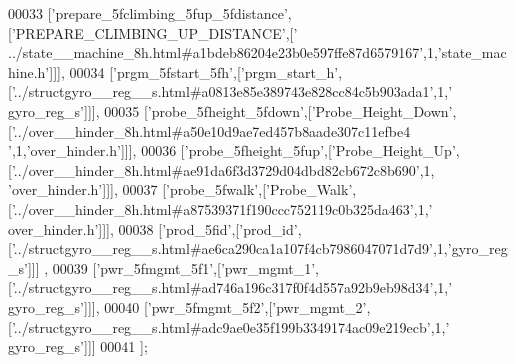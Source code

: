 \begin{DoxyCode}
00033   [\textcolor{stringliteral}{'prepare\_5fclimbing\_5fup\_5fdistance'},[\textcolor{stringliteral}{'PREPARE\_CLIMBING\_UP\_DISTANCE'},[\textcolor{stringliteral}{'
      ../state\_\_machine\_8h.html#a1bdeb86204e23b0e597ffe87d6579167'},1,\textcolor{stringliteral}{'state\_machine.h'}]]],
00034   [\textcolor{stringliteral}{'prgm\_5fstart\_5fh'},[\textcolor{stringliteral}{'prgm\_start\_h'},[\textcolor{stringliteral}{'../structgyro\_\_reg\_\_s.html#a0813e85e389743e828cc84c5b903ada1'},1,\textcolor{stringliteral}{'
      gyro\_reg\_s'}]]],
00035   [\textcolor{stringliteral}{'probe\_5fheight\_5fdown'},[\textcolor{stringliteral}{'Probe\_Height\_Down'},[\textcolor{stringliteral}{'../over\_\_hinder\_8h.html#a50e10d9ae7ed457b8aade307c11efbe4
      '},1,\textcolor{stringliteral}{'over\_hinder.h'}]]],
00036   [\textcolor{stringliteral}{'probe\_5fheight\_5fup'},[\textcolor{stringliteral}{'Probe\_Height\_Up'},[\textcolor{stringliteral}{'../over\_\_hinder\_8h.html#ae91da6f3d3729d04dbd82cb672c8b690'},1,\textcolor{stringliteral}{
      'over\_hinder.h'}]]],
00037   [\textcolor{stringliteral}{'probe\_5fwalk'},[\textcolor{stringliteral}{'Probe\_Walk'},[\textcolor{stringliteral}{'../over\_\_hinder\_8h.html#a87539371f190ccc752119c0b325da463'},1,\textcolor{stringliteral}{'
      over\_hinder.h'}]]],
00038   [\textcolor{stringliteral}{'prod\_5fid'},[\textcolor{stringliteral}{'prod\_id'},[\textcolor{stringliteral}{'../structgyro\_\_reg\_\_s.html#ae6ca290ca1a107f4cb7986047071d7d9'},1,\textcolor{stringliteral}{'gyro\_reg\_s'}]]]
      ,
00039   [\textcolor{stringliteral}{'pwr\_5fmgmt\_5f1'},[\textcolor{stringliteral}{'pwr\_mgmt\_1'},[\textcolor{stringliteral}{'../structgyro\_\_reg\_\_s.html#ad746a196c317f0f4d557a92b9eb98d34'},1,\textcolor{stringliteral}{'
      gyro\_reg\_s'}]]],
00040   [\textcolor{stringliteral}{'pwr\_5fmgmt\_5f2'},[\textcolor{stringliteral}{'pwr\_mgmt\_2'},[\textcolor{stringliteral}{'../structgyro\_\_reg\_\_s.html#adc9ae0e35f199b3349174ac09e219ecb'},1,\textcolor{stringliteral}{'
      gyro\_reg\_s'}]]]
00041 ];
\end{DoxyCode}
